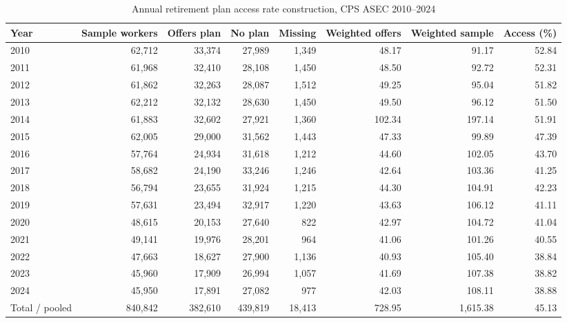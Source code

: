 \documentclass[11pt]{article}
\begin{document}
\thispagestyle{plain}
\begin{table}[H]
\centering
\footnotesize
\setlength{\tabcolsep}{4pt}
\renewcommand{\arraystretch}{1.05}
\caption{Annual retirement plan access rate construction, CPS ASEC 2010--2024}
\label{tab:access-construction}
\begin{tabular}{lrrrrrrr}
\toprule
Year & Sample workers & Offers plan & No plan & Missing & Weighted offers & Weighted sample & Access (\%) \\
\midrule
2010 & 62,712 & 33,374 & 27,989 & 1,349 & 48.17 & 91.17 & 52.84 \\
2011 & 61,968 & 32,410 & 28,108 & 1,450 & 48.50 & 92.72 & 52.31 \\
2012 & 61,862 & 32,263 & 28,087 & 1,512 & 49.25 & 95.04 & 51.82 \\
2013 & 62,212 & 32,132 & 28,630 & 1,450 & 49.50 & 96.12 & 51.50 \\
2014 & 61,883 & 32,602 & 27,921 & 1,360 & 102.34 & 197.14 & 51.91 \\
2015 & 62,005 & 29,000 & 31,562 & 1,443 & 47.33 & 99.89 & 47.39 \\
2016 & 57,764 & 24,934 & 31,618 & 1,212 & 44.60 & 102.05 & 43.70 \\
2017 & 58,682 & 24,190 & 33,246 & 1,246 & 42.64 & 103.36 & 41.25 \\
2018 & 56,794 & 23,655 & 31,924 & 1,215 & 44.30 & 104.91 & 42.23 \\
2019 & 57,631 & 23,494 & 32,917 & 1,220 & 43.63 & 106.12 & 41.11 \\
2020 & 48,615 & 20,153 & 27,640 & 822 & 42.97 & 104.72 & 41.04 \\
2021 & 49,141 & 19,976 & 28,201 & 964 & 41.06 & 101.26 & 40.55 \\
2022 & 47,663 & 18,627 & 27,900 & 1,136 & 40.93 & 105.40 & 38.84 \\
2023 & 45,960 & 17,909 & 26,994 & 1,057 & 41.69 & 107.38 & 38.82 \\
2024 & 45,950 & 17,891 & 27,082 & 977 & 42.03 & 108.11 & 38.88 \\
\midrule
Total / pooled & 840,842 & 382,610 & 439,819 & 18,413 & 728.95 & 1,615.38 & 45.13 \\
\bottomrule
\end{tabular}


\end{table}
\end{document}
